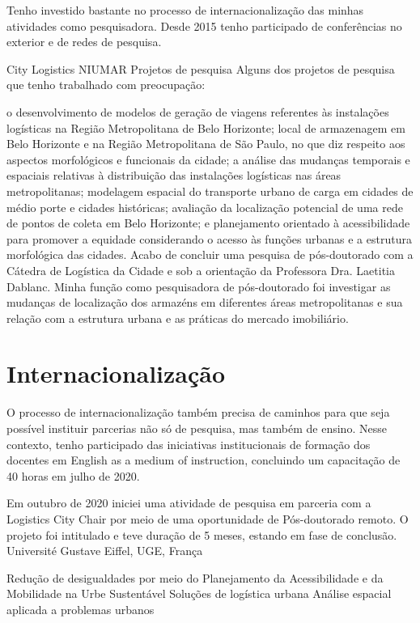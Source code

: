 \documentclass[
]{book}
\begin{document}
Tenho investido bastante no processo de internacionalização das minhas
atividades como pesquisadora. Desde 2015 tenho participado de
conferências no exterior e de redes de pesquisa.

City Logistics NIUMAR Projetos de pesquisa Alguns dos projetos de
pesquisa que tenho trabalhado com preocupação:

o desenvolvimento de modelos de geração de viagens referentes às
instalações logísticas na Região Metropolitana de Belo Horizonte; local
de armazenagem em Belo Horizonte e na Região Metropolitana de São Paulo,
no que diz respeito aos aspectos morfológicos e funcionais da cidade; a
análise das mudanças temporais e espaciais relativas à distribuição das
instalações logísticas nas áreas metropolitanas; modelagem espacial do
transporte urbano de carga em cidades de médio porte e cidades
históricas; avaliação da localização potencial de uma rede de pontos de
coleta em Belo Horizonte; e planejamento orientado à acessibilidade para
promover a equidade considerando o acesso às funções urbanas e a
estrutura morfológica das cidades. Acabo de concluir uma pesquisa de
pós-doutorado com a Cátedra de Logística da Cidade e sob a orientação da
Professora Dra. Laetitia Dablanc. Minha função como pesquisadora de
pós-doutorado foi investigar as mudanças de localização dos armazéns em
diferentes áreas metropolitanas e sua relação com a estrutura urbana e
as práticas do mercado imobiliário.

\hypertarget{internacionalizauxe7uxe3o}{%
\section{Internacionalização}\label{internacionalizauxe7uxe3o}}

O processo de internacionalização também precisa de caminhos para que
seja possível instituir parcerias não só de pesquisa, mas também de
ensino. Nesse contexto, tenho participado das iniciativas institucionais
de formação dos docentes em English as a medium of instruction,
concluindo um capacitação de 40 horas em julho de 2020.

Em outubro de 2020 iniciei uma atividade de pesquisa em parceria com a
Logistics City Chair por meio de uma oportunidade de Pós-doutorado
remoto. O projeto foi intitulado e teve duração de 5 meses, estando em
fase de conclusão. Université Gustave Eiffel, UGE, França

Redução de desigualdades por meio do Planejamento da Acessibilidade e da
Mobilidade na Urbe Sustentável Soluções de logística urbana Análise
espacial aplicada a problemas urbanos
\end{document}

